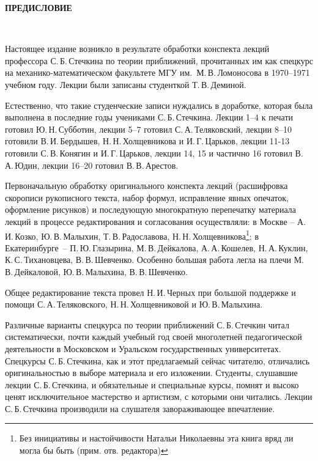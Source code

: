 \begin{center}

{\Large \bf ПРЕДИСЛОВИЕ}

\end{center}

\ \

Настоящее издание возникло в результате обработки конспекта
лекций профессора С.\,Б.\,Стечкина по теории приближений, прочитанных им как спецкурс на
механико-математическом факультете МГУ им.~М.\,В.\,Ломоносова в
1970--1971 учебном году. Лекции были записаны студенткой
Т.\,В.\,Деминой.

Естественно, что такие студенческие записи
нуждались в доработке, которая была выполнена в последние
годы учениками С.\,Б.\,Стечкина. Лекции 1--4 к печати
готовил Ю.\,Н.\,Субботин, лекции 5--7 готовил С.\,А.\,Теляковский,
лекции 8--10 готовили В.\,И.\,Бердышев, Н.\,Н.\,Холщевникова и И.\,Г.\,Царьков,
лекции 11-13 готовили С.\,В.\,Конягин и И.\,Г.\,Царьков, лекции
14, 15 и частично 16 готовил В.\,А.\,Юдин, лекции 16--20
готовил В.\,В.\,Арестов.

Первоначальную обработку
оригинального конспекта лекций (расшифровка скорописи рукописного
текста, набор формул, исправление явных опечаток,
оформление рисунков) и последующую многократную перепечатку
материала лекций в процессе редактирования и согласования
осуществляли: в Москве -- А.\,И.\,Козко, Ю.\,В.\,Малыхин,
Т.\,В.\,Радославова, Н.\,Н.\,Холщевникова\footnote{Без инициативы и настойчивости
Натальи Николаевны эта книга вряд ли могла бы быть (прим. отв. редактора)};
в Екатеринбурге~--
П.\,Ю.\,Глазырина, М.\,В.\,Дейкалова, А.\,А.\,Кошелев,
Н.\,А.\,Куклин, К.\,С.\,Тихановцева, В.\,В.\,Шевченко.
Особенно большая работа легла на плечи М.\,В.\,Дейкаловой,
Ю.\,В.\,Малыхина, В.\,В.\,Шевченко.

Общее редактирование текста провел Н.\,И.\,Черных при большой поддержке и
помощи С.\,А.\,Теляковского, Н.\,Н.\,Холщевниковой и
Ю.\,В.\,Малыхина.

Различные варианты спецкурса по теории приближений
С.\,Б.\,Стечкин читал систематически, почти каждый учебный
год своей многолетней педагогической деятельности в
Московском и Уральском государственных университетах.
Спецкурсы С.\,Б.\,Стечкина, как и этот предлагаемый сейчас
читателю, отличались оригинальностью в выборе материала и
его изложении. Студенты, слушавшие лекции С.\,Б.\,Стечкина,
и обязательные и специальные курсы, помнят и высоко ценят
исключительное мастерство и артистизм, с которыми они
читались. Лекции С.\,Б.\,Стечкина производили на слушателя
завораживающее впечатление.

